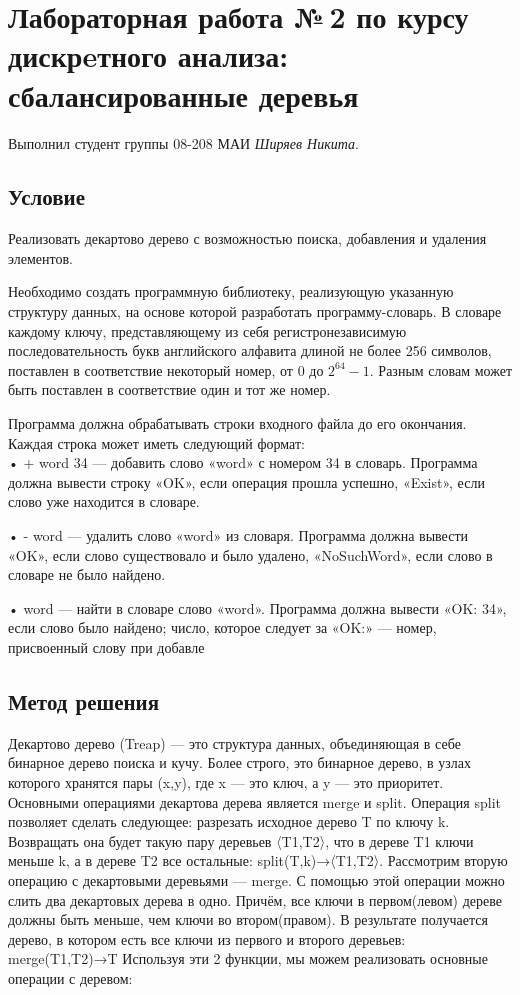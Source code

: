 \documentclass[12pt]{article}
\begin{document}
\section*{Лабораторная работа №\,2 по курсу дискрeтного анализа: сбалансированные деревья}

Выполнил студент группы 08-208 МАИ \textit{Ширяев Никита}.

\subsection*{Условие}


Реализовать декартово дерево с возможностью поиска, добавления и удаления элементов.

Необходимо создать программную библиотеку, реализующую указанную структуру данных, на основе которой разработать программу-словарь. В словаре каждому ключу, представляющему из себя регистронезависимую последовательность букв английского алфавита длиной не более 256 символов, поставлен в соответствие некоторый номер, от 0 до $2^{64} - 1$. Разным словам может быть поставлен в соответствие один и тот же номер.

Программа должна обрабатывать строки входного файла до его окончания. Каждая строка может иметь следующий формат: \\

• + word 34 — добавить слово «word» с номером 34 в словарь. Программа должна вывести строку «OK», если операция прошла успешно, «Exist», если слово уже находится в словаре.

• - word — удалить слово «word» из словаря. Программа должна вывести «OK», если слово существовало и было удалено, «NoSuchWord», если слово в словаре не было найдено.

• word — найти в словаре слово «word». Программа должна вывести «OK: 34», если слово было найдено; число, которое следует за «OK:» — номер, присвоенный слову при добавле



\subsection*{Метод решения}

Декартово дерево (Treap) — это структура данных, объединяющая в себе бинарное
дерево поиска и кучу. Более строго, это бинарное дерево, в узлах которого хранятся
пары (x,y), где x — это ключ, а y — это приоритет. Основными операциями декартова
дерева является merge и split.
Операция split позволяет сделать следующее: разрезать исходное дерево T по ключу k.
Возвращать она будет такую пару деревьев 〈T1,T2〉, что в дереве T1 ключи меньше k,
а в дереве T2 все остальные: split(T,k)→〈T1,T2〉.
Рассмотрим вторую операцию с декартовыми деревьями — merge. С помощью этой
операции можно слить два декартовых дерева в одно. Причём, все ключи в первом(левом)
дереве должны быть меньше, чем ключи во втором(правом). В результате получается
дерево, в котором есть все ключи из первого и второго деревьев: merge(T1,T2)→T
Используя эти 2 функции, мы можем реализовать основные операции с деревом:\\
\end{document}
